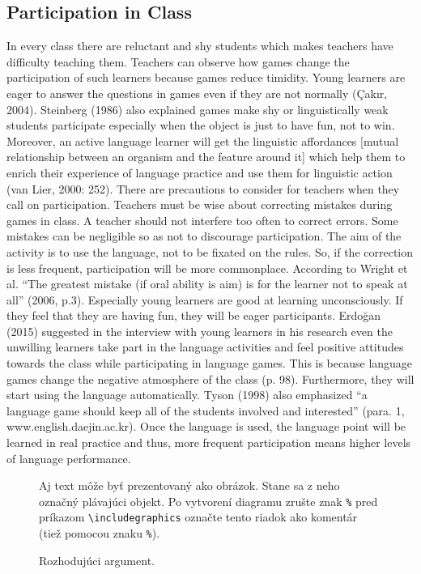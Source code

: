 \documentclass[10pt,twoside,english,a4paper]{article}
\begin{document}
 \subsection{Participation in Class }
In every class there are reluctant and shy students which makes teachers have difficulty teaching them. Teachers can observe how games change the participation of such learners because games reduce timidity. Young learners are eager to answer the questions in games even if they are not normally (Çakır, 2004). Steinberg (1986) also explained games make shy or linguistically weak students participate especially when the object is just to have fun, not to win. Moreover, an active language learner will get the linguistic affordances [mutual relationship between an organism and the feature around it] which help them to enrich their experience of language practice and use them for linguistic action (van Lier, 2000: 252). There are precautions to consider for teachers when they call on participation. Teachers must be wise about correcting mistakes during games in class. A teacher should not interfere too often to correct errors. Some mistakes can be negligible so as not to discourage participation. The aim of the activity is to use the language, not to be fixated on the rules. So, if the correction is less frequent, participation will be more commonplace. According to Wright et  al.  “The greatest  mistake (if oral ability  is aim) is  for the learner not  to speak  at all” (2006, p.3). Especially young learners are good at learning unconsciously. If they feel that they are having fun, they will be eager participants. Erdoğan  (2015) suggested in the interview with young learners in his research even the unwilling learners take part in the language activities and feel positive attitudes towards the class while participating in language games. This is because language games change the negative atmosphere of the class (p. 98). Furthermore, they will start using the language automatically. Tyson (1998) also emphasized “a language game should keep all of the students involved and interested” (para. 1, www.english.daejin.ac.kr). Once the language is used, the language point will be learned in real practice and thus, more frequent participation means higher  levels of language performance. 


\begin{figure*}[tbh]
\centering
Aj text môže byť prezentovaný ako obrázok. Stane sa z neho označný plávajúci objekt. Po vytvorení diagramu zrušte znak \texttt{\%} pred príkazom \verb|\includegraphics| označte tento riadok ako komentár (tiež pomocou znaku \texttt{\%}).
\caption{Rozhodujúci argument.}
\label{f:rozhod}
\end{figure*}
\end{document}
